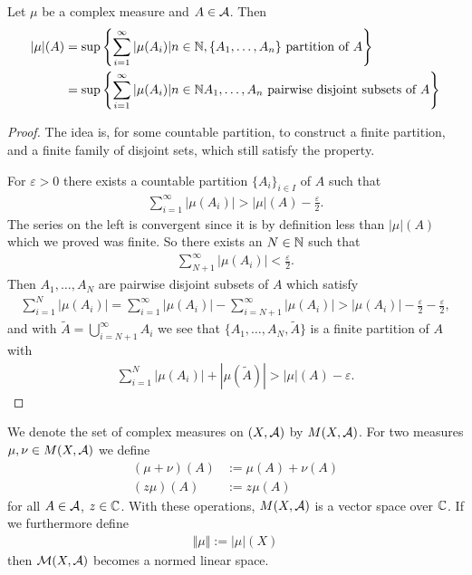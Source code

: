 \begin{corollary}\label{cor: stupid corollary}
Let $\mu$ be a complex measure and $A\in \mathcal{A}$. Then
\begin{align*}
	|\mu|(A)&=\sup\left\{ \sum_{i=1}^{\infty} |\mu(A_{i}) | n\in \mathbb{N}, \{A_{1}, \dots, A_{n}\} \text{ partition of } A \right\} \\
	&=\sup\left\{ \sum_{i=1}^{\infty} |\mu(A_{i}) | n\in \mathbb{N} A_{1}, \dots, A_{n} \text{ pairwise disjoint subsets of } A \right\}
\end{align*}
\end{corollary}
\begin{proof}
The idea is, for some countable partition, to construct a finite partition, and a finite family of disjoint sets, which still satisfy the property.

For $\varepsilon>0$ there exists a countable partition $\{A_{i}\}_{i\in I}$ of $A$ such that
\begin{align*}
	\sum_{i=1}^{\infty} |\mu(A_{i})| > |\mu|(A)-\frac{\varepsilon}{2}.
\end{align*}
The series on the left is convergent since it is by definition less than $|\mu|(A)$ which we proved was finite. So there exists an $N\in \mathbb{N}$ such that
\begin{align*}
	\sum_{N+1}^{\infty} |\mu(A_{i})| < \frac{\varepsilon}{2}.
\end{align*}
Then $A_{1}, \dots, A_{N}$ are pairwise disjoint subsets of $A$ which satisfy
\begin{align*}
	\sum_{i=1}^{N}|\mu(A_{i})| = \sum_{i=1}^{\infty}|\mu(A_{i})| - \sum_{i=N+1}^{\infty}|\mu(A_{i})| > |\mu(A_{i})|-\frac{\varepsilon}{2}-\frac{\varepsilon}{2},
\end{align*}
and with $\tilde{A}=\bigcup_{i=N+1}^{\infty}A_{i}$ we see that $\{A_{1}, \dots, A_{N}, \tilde{A}\}$ is a finite partition of $A$ with
\begin{align*}
	\sum_{i=1}^{N}|\mu(A_{i})| + |\mu(\tilde{A})| > |\mu|(A)-\varepsilon.
\end{align*}
\end{proof}


We denote the set of complex measures on $(X, \mathcal{A})$ by $M(X, \mathcal{A})$.
For two measures $\mu, \nu \in M(X, \mathcal{A})$ we define
\begin{align*}
	(\mu + \nu)(A)&:=\mu(A)+\nu(A) \\
	(z\mu)(A)&:=z\mu(A)
\end{align*}
for all $A\in \mathcal{A}$, $z\in \mathbb{C}$. With these operations, $M(X, \mathcal{A})$ is a vector space over $\mathbb{C}$. If we furthermore define
\begin{align*}
	\Vert \mu \Vert := |\mu|(X)
\end{align*}
then $\mathcal{M}(X, \mathcal{A})$ becomes a normed linear space.


